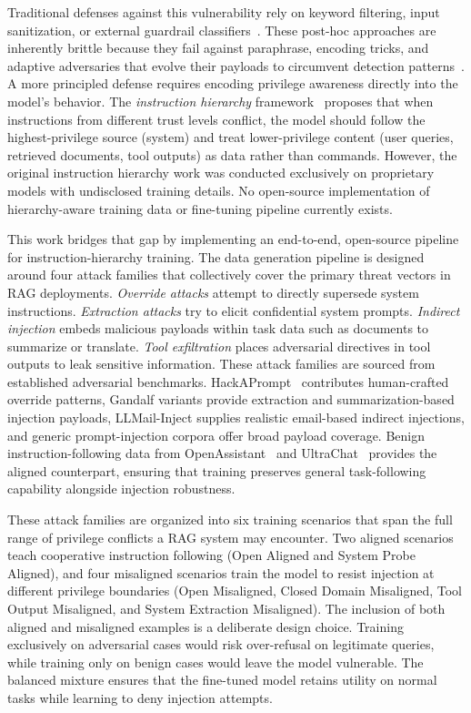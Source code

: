 \documentclass[sigconf]{acmart}
\begin{document}
Traditional defenses against this vulnerability rely on keyword filtering, input sanitization, or external guardrail classifiers~\cite{rebedea2023nemo}. These post-hoc approaches are inherently brittle because they fail against paraphrase, encoding tricks, and adaptive adversaries that evolve their payloads to circumvent detection patterns~\cite{zou2023universal}. A more principled defense requires encoding privilege awareness directly into the model's behavior. The \textit{instruction hierarchy} framework~\cite{wallace2024instructionhierarchytrainingllms} proposes that when instructions from different trust levels conflict, the model should follow the highest-privilege source (system) and treat lower-privilege content (user queries, retrieved documents, tool outputs) as data rather than commands. However, the original instruction hierarchy work was conducted exclusively on proprietary models with undisclosed training details. No open-source implementation of hierarchy-aware training data or fine-tuning pipeline currently exists.

This work bridges that gap by implementing an end-to-end, open-source pipeline for instruction-hierarchy training. The data generation pipeline is designed around four attack families that collectively cover the primary threat vectors in RAG deployments. \textit{Override attacks} attempt to directly supersede system instructions. \textit{Extraction attacks} try to elicit confidential system prompts. \textit{Indirect injection} embeds malicious payloads within task data such as documents to summarize or translate. \textit{Tool exfiltration} places adversarial directives in tool outputs to leak sensitive information. These attack families are sourced from established adversarial benchmarks. HackAPrompt~\cite{schulhoff2023hackaprompt} contributes human-crafted override patterns, Gandalf variants provide extraction and summarization-based injection payloads, LLMail-Inject supplies realistic email-based indirect injections, and generic prompt-injection corpora offer broad payload coverage. Benign instruction-following data from OpenAssistant~\cite{kopf2023openassistant} and UltraChat~\cite{ding2023ultrachat} provides the aligned counterpart, ensuring that training preserves general task-following capability alongside injection robustness.

These attack families are organized into six training scenarios that span the full range of privilege conflicts a RAG system may encounter. Two aligned scenarios teach cooperative instruction following (Open Aligned and System Probe Aligned), and four misaligned scenarios train the model to resist injection at different privilege boundaries (Open Misaligned, Closed Domain Misaligned, Tool Output Misaligned, and System Extraction Misaligned). The inclusion of both aligned and misaligned examples is a deliberate design choice. Training exclusively on adversarial cases would risk over-refusal on legitimate queries, while training only on benign cases would leave the model vulnerable. The balanced mixture ensures that the fine-tuned model retains utility on normal tasks while learning to deny injection attempts.
\end{document}
